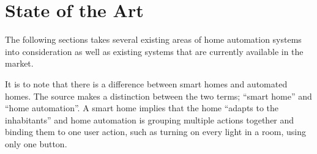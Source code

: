 \section{State of the Art}\label{sec:sota}
The following sections takes several existing areas of home automation systems into consideration as well as existing systems that are currently available in the market.

It is to note that there is a difference between smart homes and automated homes. The source \cite{HAInterviews} makes a distinction between the two terms; \enquote{smart home} and \enquote{home automation}. A smart home implies that the home \enquote{adapts to the inhabitants}\cite{HAInterviews} and home automation is grouping multiple actions together and binding them to one user action, such as turning on every light in a room, using only one button.




